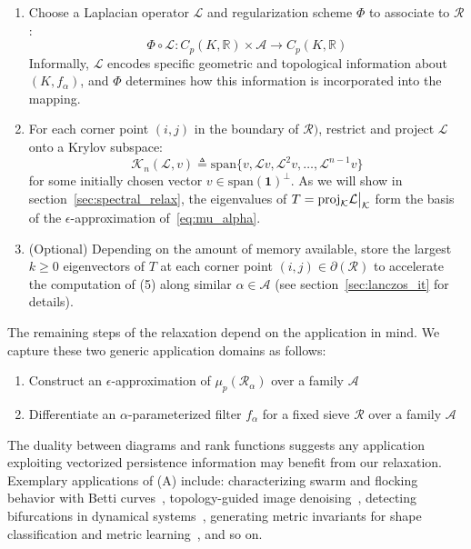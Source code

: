 \documentclass[10pt]{article}
\numberwithin{equation}{section}
\newcommand{\+}{%
	\raisebox{0.18ex}{\scaleobj{0.55}{+}}
}
\newcommand\restr[2]{{%
  \left.\kern-\nulldelimiterspace %
  #1 %
  \vphantom{\big|} %
  \right|_{#2} %
  }}
\theoremstyle{definition}
\theoremstyle{definition}
\begin{document}
\begin{enumerate}
	\item Choose a Laplacian operator $\mathcal{L}$ and regularization scheme $\Phi$ to associate to $\mathcal{R}$: 
$$
\Phi \circ \mathcal{L} : C_p(K, \mathbb{R}) \times \mathcal{A} \to C_p(K, \mathbb{R})
$$
Informally, $\mathcal{L}$ encodes specific geometric and topological information about $(K, f_\alpha)$, and $\Phi$ determines how this information is incorporated into the mapping. 
	\item For each corner point $(i,j)$ in the boundary of $\mathcal{R})$, restrict and project $\mathcal{L}$ onto a Krylov subspace: 
	$$
	\mathcal{K}_n(\mathcal{L}, v) \triangleq \mathrm{span}\{ v, \mathcal{L}v, \mathcal{L}^2 v, \dots, \mathcal{L}^{n-1}v \}
	$$
	for some initially chosen vector $v \in \mathrm{span}(\textbf{1})^\perp$. As we will show in section~\ref{sec:spectral_relax}, the eigenvalues of $T = \mathrm{proj}_{\mathcal{K}} \restr{\mathcal{L}}{\mathcal{K}}$ form the basis of the $\epsilon$-approximation of~\eqref{eq:mu_alpha}.
	\item (Optional) Depending on the amount of memory available, store the largest $k \geq 0$ eigenvectors of $T$ at each corner point $(i,j) \in \partial(\mathcal{R})$ to accelerate the computation of (5) along similar $\alpha \in \mathcal{A}$ (see section~\ref{sec:lanczos_it} for details).
\end{enumerate}
The remaining steps of the relaxation depend on the application in mind. We capture these two generic application domains as follows: 
\begin{enumerate}[label=(\Alph*)]
	\item Construct an $\epsilon$-approximation of $\mu_p(\mathcal{R}_\alpha)$ over a family $\mathcal{A}$
	\item Differentiate an $\alpha$-parameterized filter $f_\alpha$ for a fixed sieve $\mathcal{R}$ over a family $\mathcal{A}$ %
\end{enumerate}
\noindent
The duality between diagrams and rank functions suggests any application exploiting vectorized persistence information may benefit from our relaxation. 
Exemplary applications of (A) include: characterizing swarm and flocking behavior with Betti curves~\cite{}, topology-guided image denoising~\cite{}, detecting bifurcations in dynamical systems~\cite{}, generating metric invariants for shape classification and metric learning~\cite{},  and so on. 
\end{document}

